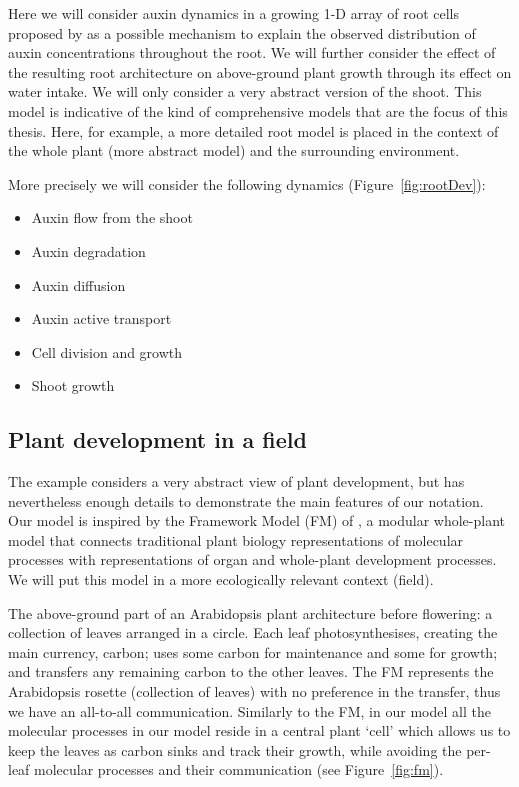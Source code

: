 \documentclass[phd]{infthesis}
\begin{document}
Here we will consider auxin dynamics in a growing 1-D array of root cells
proposed by \citep{mironova_plausible_2010} as a possible mechanism to explain
the observed distribution of auxin concentrations throughout the root. We will
further consider the effect of the resulting root architecture on above-ground
plant growth through its effect on water intake. We will only consider a very
abstract version of the shoot. This model is indicative of the kind of
comprehensive models that are the focus of this thesis. Here, for example, a
more detailed root model is placed in the context of the whole plant (more
abstract model) and the surrounding environment.

More precisely we will consider the following dynamics (Figure~\ref{fig:rootDev}):
\begin{itemize}
\item Auxin flow from the shoot
\item Auxin degradation
\item Auxin diffusion
\item Auxin active transport
\item Cell division and growth
\item Shoot growth
\end{itemize}


\subsection{Plant development in a field}
The example considers a very abstract view of plant development, but has
nevertheless enough details to demonstrate the main features of our
notation. Our model is inspired by the Framework Model (FM) of
\citet{chew2014multiscale}, a modular whole-plant model that connects
traditional plant biology representations of molecular processes with
representations of organ and whole-plant development processes. We will put this
model in a more ecologically relevant context (field).

The above-ground part of an Arabidopsis plant
architecture before flowering: a collection of leaves arranged in a circle. Each
leaf photosynthesises, creating the main currency, carbon; uses some carbon for
maintenance and some for growth; and transfers any remaining carbon to the other
leaves. The FM represents the Arabidopsis rosette (collection of leaves) with no
preference in the transfer, thus we have an all-to-all communication. Similarly
to the FM, in our model all the molecular processes in our model reside in a
central plant `cell' which allows us to keep the leaves as carbon sinks and
track their growth, while avoiding the per-leaf molecular processes and their
communication (see Figure~\ref{fig:fm}).
\end{document}
